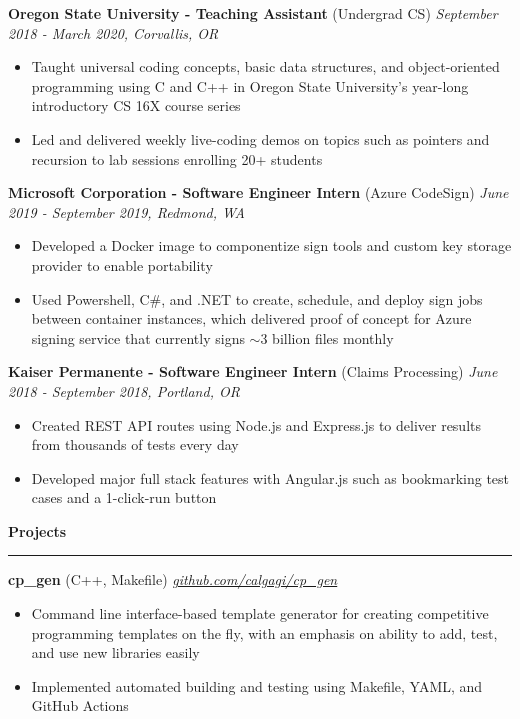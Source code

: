 \documentclass{article}
\def\hrulefill{\leavevmode\leaders\hrule height 1.2pt\hfill\kern\z}
\begin{document}
\vskip 0.1in

\noindent \normalsize \textbf{Oregon State University - Teaching Assistant} \footnotesize (Undergrad CS) \hfill \small \textit{September 2018 - March 2020, Corvallis, OR}
\begin{itemize}
    \item Taught universal coding concepts, basic data structures, and object-oriented programming using C and C++ in Oregon State University’s year-long introductory CS 16X course series
    \item Led and delivered weekly live-coding demos on topics such as pointers and recursion to lab sessions enrolling 20+ students
\end{itemize}

\vskip 0.1in

\noindent \normalsize \textbf{Microsoft Corporation - Software Engineer Intern} \footnotesize (Azure CodeSign) \hfill \small \textit{June 2019 - September 2019, Redmond, WA}
\begin{itemize}
    \item Developed a Docker image to componentize sign tools and custom key storage provider to enable portability
    \item Used Powershell, C\#, and .NET to create, schedule, and deploy sign jobs between container instances, which delivered proof of concept for Azure signing service that currently signs $\sim$3 billion files monthly
\end{itemize}

\vskip 0.1in

\noindent \normalsize \textbf{Kaiser Permanente - Software Engineer Intern} \footnotesize (Claims Processing) \hfill \small \textit{June 2018 - September 2018, Portland, OR}
\begin{itemize}
    \item Created REST API routes using Node.js and Express.js to deliver results from thousands of tests every day
    \item Developed major full stack features with Angular.js such as bookmarking test cases and a 1-click-run button
\end{itemize}

\vskip 0.1in

\noindent \large \textbf{Projects } \hrulefill
\vskip 0.1in
\noindent \normalsize \textbf{cp\_gen} \footnotesize (C++, Makefile) \hfill \small \textit{\href{https://github.com/calgagi/cp_gen}{github.com/calgagi/cp\_gen}}
\begin{itemize}
    \item Command line interface-based template generator for creating competitive programming templates on the fly, with an emphasis on ability to add, test, and use new libraries easily
    \item Implemented automated building and testing using Makefile, YAML, and GitHub Actions
\end{itemize}
\end{document}
